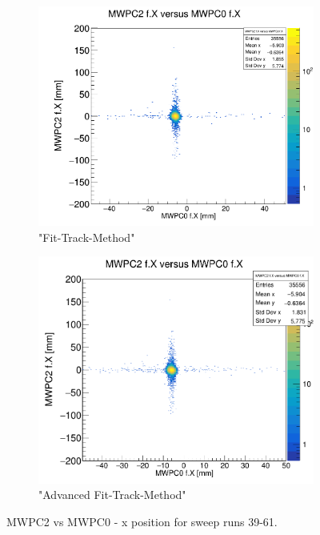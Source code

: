 \documentclass[12pt, letterpaper]{article}
\begin{document}
\begin{figure}[!htbp]
\begin{subfigure}{.5\textwidth}
\end{subfigure}
\begin{subfigure}{.5\textwidth}
  \centering
  \includegraphics[width=.9\linewidth]{plot_imgs/mw2_mw0_fit.png} 
  \caption{"Fit-Track-Method"}
  \label{fig:sub-second}
\end{subfigure}
\begin{subfigure}{.5\textwidth}
  \centering
  \includegraphics[width=.9\linewidth]{plot_imgs/mw2_mw0_alpha.png} 
  \caption{"Advanced Fit-Track-Method"}
  \label{fig:sub-second}
\end{subfigure}
\caption{MWPC2 vs MWPC0 - x position for sweep runs 39-61.}
\label{fig:fig}
\end{figure}
\FloatBarrier
\clearpage
\end{document}
